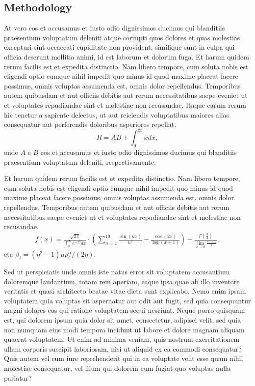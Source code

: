 \documentclass[a0,portrait]{a0poster}
\newcommand{\pa}[1]{\left({#1}\right)}
\begin{document}
\begin{mdframed}[style=MyFrame]
\begin{multicols}{2}
\section{Methodology}\label{section2}
%
At vero eos et accusamus et iusto odio dignissimos ducimus qui blanditiis praesentium voluptatum deleniti atque corrupti quos dolores et quas molestias excepturi sint occaecati cupiditate non provident, similique sunt in culpa qui officia deserunt mollitia animi, id est laborum et dolorum fuga. Et harum quidem rerum facilis est et expedita distinctio. Nam libero tempore, cum soluta nobis est eligendi optio cumque nihil impedit quo minus id quod maxime placeat facere possimus, omnis voluptas assumenda est, omnis dolor repellendus. Temporibus autem quibusdam et aut officiis debitis aut rerum necessitatibus saepe eveniet ut et voluptates repudiandae sint et molestiae non recusandae. Itaque earum rerum hic tenetur a sapiente delectus, ut aut reiciendis voluptatibus maiores alias consequatur aut perferendis doloribus asperiores repellat.
%
\begin{equation}
    R = A B + \int_0^\infty x dx,
\end{equation}
%
onde $A$ e $B$ eos et accusamus et iusto odio dignissimos ducimus qui blanditiis praesentium voluptatum deleniti, respectivamente.

Et harum quidem rerum facilis est et expedita distinctio. Nam libero tempore, cum soluta nobis est eligendi optio cumque nihil impedit quo minus id quod maxime placeat facere possimus, omnis voluptas assumenda est, omnis dolor repellendus. Temporibus autem quibusdam et aut officiis debitis aut rerum necessitatibus saepe eveniet ut et voluptates repudiandae sint et molestiae non recusandae.
%
\begin{equation}\label{eqn:L}
\begin{split}
	f(x) = \frac{\sqrt{2 \pi}}{\int_{0}^{\infty} e^{-x^2} dx} \cdot \left(\sum_{n=1}^{10} \frac{\sin(nx)}{n^2} - \frac{\cos(2x)}{\log(x+1)}\right) + \frac{\Gamma\left(\frac{3}{4}\right)}{\lim_{{x \to 0}} \frac{e^x - 1}{x}},
\end{split}
\end{equation}
%
eta $\beta_i = {\pa{\eta^{2}-1}\mu\rho_{i}^{\alpha}}/{\left({2\eta}\right)}$.

Sed ut perspiciatis unde omnis iste natus error sit voluptatem accusantium doloremque laudantium, totam rem aperiam, eaque ipsa quae ab illo inventore veritatis et quasi architecto beatae vitae dicta sunt explicabo. Nemo enim ipsam voluptatem quia voluptas sit aspernatur aut odit aut fugit, sed quia consequuntur magni dolores eos qui ratione voluptatem sequi nesciunt. Neque porro quisquam est, qui dolorem ipsum quia dolor sit amet, consectetur, adipisci velit, sed quia non numquam eius modi tempora incidunt ut labore et dolore magnam aliquam quaerat voluptatem. Ut enim ad minima veniam, quis nostrum exercitationem ullam corporis suscipit laboriosam, nisi ut aliquid ex ea commodi consequatur? Quis autem vel eum iure reprehenderit qui in ea voluptate velit esse quam nihil molestiae consequatur, vel illum qui dolorem eum fugiat quo voluptas nulla pariatur?


\end{multicols}
\end{mdframed}
\end{document}
